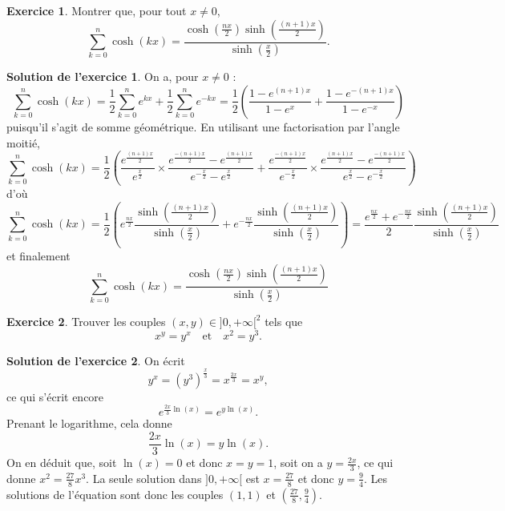 \documentclass[a4paper, 11pt,openany]{article}%
\theoremstyle{plain}
\theoremstyle{definition}
\newtheorem{exo}{Exercice}
\newtheorem{sol}{Solution de l'exercice}
\theoremstyle{remark}
\begin{document}
\begin{exo}
 Montrer que, pour tout $x \neq 0$,
 \[ \sum_{k=0}^n \cosh(kx) = \frac{\cosh \left( \frac{nx}{2} \right) \sinh\left(\frac{(n+1)x}{2} \right)}{\sinh\left( \frac{x}{2} \right)}.\]
\end{exo}

\begin{sol}
On a, pour $x \neq 0$ :
\[  \sum_{k=0}^n \cosh(kx) = \frac{1}{2} \sum_{k=0}^n e^{kx} + \frac{1}{2} \sum_{k=0}^n e^{-kx} = 
\frac{1}{2} \left( \frac{1-e^{(n+1)x}}{1-e^x} +  \frac{1-e^{-(n+1)x}}{1-e^{-x}} \right)\]
puisqu'il s'agit de somme géométrique. En utilisant une factorisation par l'angle moitié,
\[  \sum_{k=0}^n \cosh(kx) = \frac{1}{2} \left( \frac{e^{\frac{(n+1)x}{2}}}{e^{\frac{x}{2}}} \times \frac{e^{\frac{-(n+1)x}{2}}-e^{\frac{(n+1)x}{2}}}{e^{-\frac{x}{2}}-e^{\frac{x}{2}}} + \frac{e^{\frac{-(n+1)x}{2}}}{e^{-\frac{x}{2}}} \times \frac{e^{\frac{(n+1)x}{2}}-e^{\frac{-(n+1)x}{2}}}{e^{\frac{x}{2}}-e^{-\frac{x}{2}}}  \right)\]
d'où
\[  \sum_{k=0}^n \cosh(kx) = \frac{1}{2} \left(
e^{\frac{nx}{2}} \frac{\sinh \left( \frac{(n+1)x}{2}\right)}{\sinh \left( \frac{x}{2} \right)} + e^{-\frac{nx}{2}} \frac{\sinh \left( \frac{(n+1)x}{2}\right)}{\sinh \left( \frac{x}{2} \right)} \right)
=\frac{e^{\frac{nx}{2}} + e^{-\frac{nx}{2}}}{2} \frac{\sinh \left( \frac{(n+1)x}{2}\right)}{\sinh \left( \frac{x}{2} \right)}
\]
et finalement
\[ \sum_{k=0}^n \cosh(kx) = \frac{\cosh \left( \frac{nx}{2} \right) \sinh \left( \frac{(n+1)x}{2}\right)}{\sinh \left( \frac{x}{2} \right)}\]
\end{sol}


\begin{exo}
Trouver les couples $(x,y) \in ]0,+\infty[^2$ tels que
\[ x^y = y^x \quad \text{et} \quad x^2 = y^3.\]
\end{exo}

\begin{sol}
On écrit 
\[ y^x=(y^3)^{\frac{x}{3}} = x^{\frac{2x}{3}} =x^y,\]
 ce qui s'écrit encore 
 \[ e^{\frac{2x}{3} \ln(x)} = e^{y \ln(x)}.\]
 Prenant le logarithme, cela donne 
 \[ \frac{2x}{3} \ln (x)= y \ln(x).\]
 On en déduit que, soit $\ln(x)=0$ et donc $x=y=1$, soit on a $y=\frac{2x}{3}$, ce qui donne $x^2=\frac{27}{8} x^3$. La seule solution dans $]0,+\infty[$ est $x=\frac{27}{8}$ et donc $y=\frac{9}{4}$. Les solutions de l'équation sont donc les couples $(1,1)$ et $\left(\frac{27}{8},\frac{9}{4} \right)$.
\end{sol}
\end{document}
